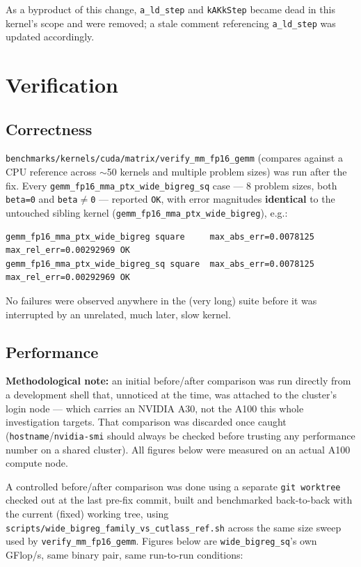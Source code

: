 \documentclass[11pt]{article}
\begin{document}
As a byproduct of this change, \texttt{a\_ld\_step} and \texttt{kAKkStep} became dead in this kernel's scope and were removed; a stale comment referencing \texttt{a\_ld\_step} was updated accordingly.

\section{Verification}

\subsection{Correctness}

\texttt{benchmarks/kernels/cuda/matrix/verify\_mm\_fp16\_gemm} (compares against a CPU reference across $\sim$50 kernels and multiple problem sizes) was run after the fix. Every \texttt{gemm\_fp16\_mma\_ptx\_wide\_bigreg\_sq} case --- 8 problem sizes, both \texttt{beta=0} and \texttt{beta}$\neq$\texttt{0} --- reported \texttt{OK}, with error magnitudes \textbf{identical} to the untouched sibling kernel (\texttt{gemm\_fp16\_mma\_ptx\_wide\_bigreg}), e.g.:

\begin{lstlisting}[language={}]
gemm_fp16_mma_ptx_wide_bigreg square     max_abs_err=0.0078125 max_rel_err=0.00292969 OK
gemm_fp16_mma_ptx_wide_bigreg_sq square  max_abs_err=0.0078125 max_rel_err=0.00292969 OK
\end{lstlisting}

No failures were observed anywhere in the (very long) suite before it was interrupted by an unrelated, much later, slow kernel.

\subsection{Performance}

\textbf{Methodological note:} an initial before/after comparison was run directly from a development shell that, unnoticed at the time, was attached to the cluster's login node --- which carries an NVIDIA A30, not the A100 this whole investigation targets. That comparison was discarded once caught (\texttt{hostname}/\texttt{nvidia-smi} should always be checked before trusting any performance number on a shared cluster). All figures below were measured on an actual A100 compute node.

A controlled before/after comparison was done using a separate \texttt{git worktree} checked out at the last pre-fix commit, built and benchmarked back-to-back with the current (fixed) working tree, using \texttt{scripts/wide\_bigreg\_family\_vs\_cutlass\_ref.sh} across the same size sweep used by \texttt{verify\_mm\_fp16\_gemm}. Figures below are \texttt{wide\_bigreg\_sq}'s own GFlop/s, same binary pair, same run-to-run conditions:
\end{document}
